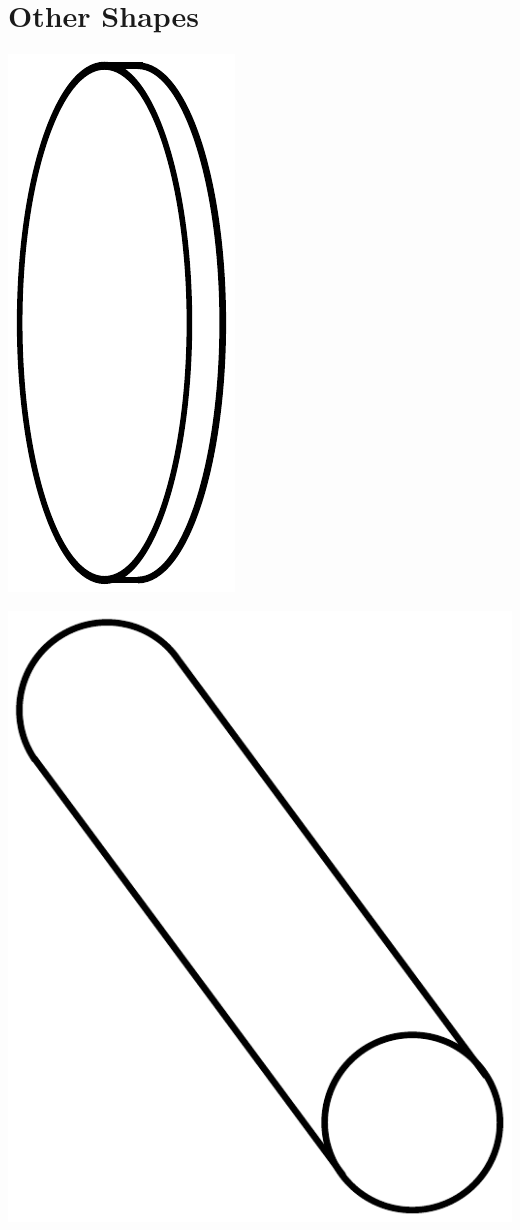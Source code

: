 \documentclass[paper=a4, fontsize=12pt]{scrartcl} %
\numberwithin{equation}{section} %
\numberwithin{figure}{section} %
\numberwithin{table}{section} %
\begin{document}
\section*{Other Shapes}
\hspace*{1cm}  \includegraphics[scale=0.5]{circulardisk.pdf}

\vspace{0.5cm}  \hspace*{0.5cm}  \includegraphics[scale=0.3]{cylinder.pdf}
\end{document}
